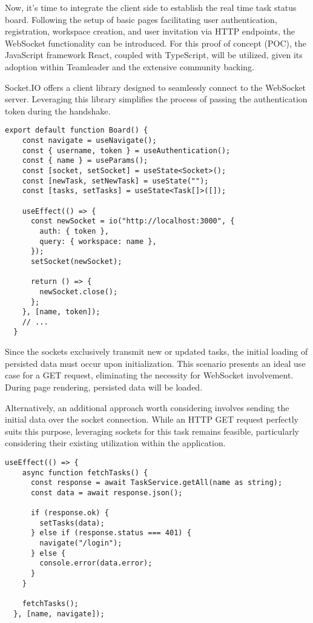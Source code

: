 Now, it's time to integrate the client side to establish the real time task status board. Following the setup of basic pages facilitating user authentication, registration, workspace creation, and user invitation via HTTP endpoints, the WebSocket functionality can be introduced. For this proof of concept (POC), the JavaScript framework React, coupled with TypeScript, will be utilized, given its adoption within Teamleader and the extensive community backing.

Socket.IO offers a client library designed to seamlessly connect to the WebSocket server. Leveraging this library simplifies the process of passing the authentication token during the handshake.

\begin{lstlisting}[caption=Using the WebSocket]
  export default function Board() {
    const navigate = useNavigate();
    const { username, token } = useAuthentication();
    const { name } = useParams();
    const [socket, setSocket] = useState<Socket>();
    const [newTask, setNewTask] = useState("");
    const [tasks, setTasks] = useState<Task[]>([]);
   
    useEffect(() => {
      const newSocket = io("http://localhost:3000", {
        auth: { token },
        query: { workspace: name },
      });
      setSocket(newSocket);
   
      return () => {
        newSocket.close();
      };
    }, [name, token]);
    // ... 
  }  
\end{lstlisting}

Since the sockets exclusively transmit new or updated tasks, the initial loading of persisted data must occur upon initialization. This scenario presents an ideal use case for a GET request, eliminating the necessity for WebSocket involvement. During page rendering, persisted data will be loaded.

Alternatively, an additional approach worth considering involves sending the initial data over the socket connection. While an HTTP GET request perfectly suits this purpose, leveraging sockets for this task remains feasible, particularly considering their existing utilization within the application.


\begin{lstlisting}[caption=Loading persisted data]
  useEffect(() => {
    async function fetchTasks() {
      const response = await TaskService.getAll(name as string);
      const data = await response.json();
 
      if (response.ok) {
        setTasks(data);
      } else if (response.status === 401) {
        navigate("/login");
      } else {
        console.error(data.error);
      }
    }
 
    fetchTasks();
  }, [name, navigate]);
\end{lstlisting}

